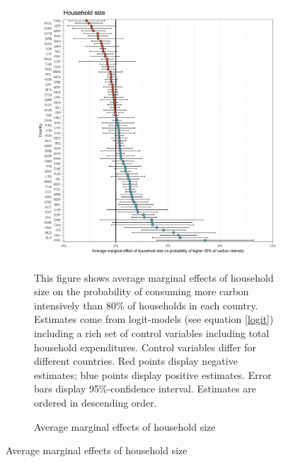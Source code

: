  \begin{figure}[ht!]\ContinuedFloat
   \centering
   \begin{subfigure}[b]{\textwidth}
   \centering
   \caption{Average marginal effects of household size} \label{fig:Logit_ME_size}
   \includegraphics{1_Figures/Analysis_Logit_Models_Marginal_Effects/Average_Marginal_Effects_affected_upper_80_hh_size_2017.jpg}
   \begin{subcaption2}
     This figure shows average marginal effects of household size on the probability of consuming more carbon intensively than 80\% of households in each country. Estimates come from logit-models (see equation \ref{logit}) including a rich set of control variables including total household expenditures. Control variables differ for different countries. Red points display negative estimates; blue points display positive estimates. Error bars display 95\%-confidence interval. Estimates are ordered in descending order.
   \end{subcaption2}
   \end{subfigure}
 \end{figure}
 \clearpage

